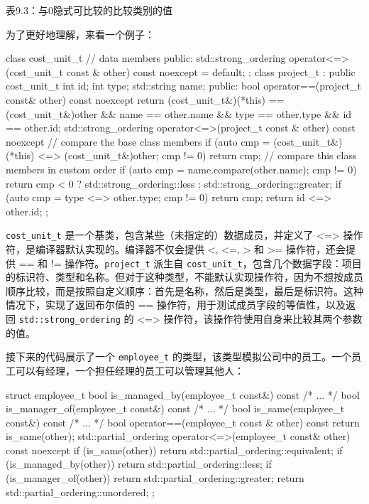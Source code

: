 \begin{center}
表9.3：与0隐式可比较的比较类别的值
\end{center}

为了更好地理解，来看一个例子：

\begin{cpp}
class cost_unit_t
{
    // data members
    public:
    std::strong_ordering operator<=>(cost_unit_t const & other) const noexcept = default;
};
class project_t : public cost_unit_t
{
    int         id;
    int         type;
    std::string name;
public:
    bool operator==(project_t const& other) const noexcept
    {
        return (cost_unit_t&)(*this) == (cost_unit_t&)other &&
        name == other.name &&
        type == other.type &&
        id == other.id;
    }
    std::strong_ordering operator<=>(project_t const & other) const noexcept
    {
        // compare the base class members
        if (auto cmp = (cost_unit_t&)(*this) <=> (cost_unit_t&)other;
        cmp != 0)
            return cmp;
        // compare this class members in custom order
        if (auto cmp =  name.compare(other.name); cmp != 0)
            return cmp < 0 ? std::strong_ordering::less :
                std::strong_ordering::greater;
        if (auto cmp = type <=> other.type; cmp != 0)
            return cmp;
        return id <=> other.id;
    }
};
\end{cpp}

\verb|cost_unit_t| 是一个基类，包含某些（未指定的）数据成员，并定义了 <=> 操作符，是编译器默认实现的。编译器不仅会提供 <, <=, > 和 >= 操作符，还会提供 == 和 != 操作符。\verb|project_t| 派生自 \verb|cost_unit_t|，包含几个数据字段：项目的标识符、类型和名称。但对于这种类型，不能默认实现操作符，因为不想按成员顺序比较，而是按照自定义顺序：首先是名称，然后是类型，最后是标识符。这种情况下，实现了返回布尔值的 == 操作符，用于测试成员字段的等值性，以及返回 \verb|std::strong_ordering| 的 <=> 操作符，该操作符使用自身来比较其两个参数的值。

接下来的代码展示了一个 \verb|employee_t| 的类型，该类型模拟公司中的员工。一个员工可以有经理，一个担任经理的员工可以管理其他人：

\begin{cpp}
struct employee_t
{
    bool is_managed_by(employee_t const&) const { /* ... */ }
    bool is_manager_of(employee_t const&) const { /* ... */ }
    bool is_same(employee_t const&) const { /* ... */ }
    bool operator==(employee_t const & other) const
    {
        return is_same(other);
    }
    std::partial_ordering operator<=>(employee_t const& other) const noexcept
    {
        if (is_same(other))
            return std::partial_ordering::equivalent;
        if (is_managed_by(other))
            return std::partial_ordering::less;
        if (is_manager_of(other))
            return std::partial_ordering::greater;
        return std::partial_ordering::unordered;
    }
};
\end{cpp}

